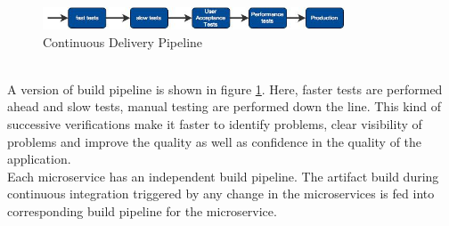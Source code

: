\begin{enumerate}
\\
\begin{figure}[H]
\begin{center}
\includegraphics[width=0.8\textwidth]{figures/challenges_six_continuous_delivery}
\caption{Continuous Delivery Pipeline \cite{Newman:2015aa}}
\label{fig:challanges_of_microservices_architecture/deployment/continuous_delivery}
\end{center}
\end{figure}
\\
A version of build pipeline is shown in figure \ref{fig:challanges_of_microservices_architecture/deployment/continuous_delivery}. Here, faster tests are performed ahead and slow tests, manual testing are performed down the line. This kind of successive verifications make it faster to identify problems, clear visibility of problems and improve the quality as well as confidence in the quality of the application.\\
Each microservice has an independent build pipeline. The artifact build during continuous integration triggered by any change in the microservices is fed into corresponding build pipeline for the microservice. \cite{Newman:2015aa} \cite{Fowler:2013aa}
\end{enumerate}













